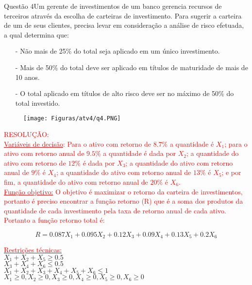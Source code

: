 \documentclass[12pt]{article}
\begin{document}
\begin{section}{Questão 4}{Um gerente de investimentos de um banco gerencia recursos de terceiros através da escolha de carteiras de investimento. Para sugerir a carteira de um de seus clientes, precisa levar em consideração a análise de risco efetuada, a qual determina que:}

\begin{itemize}
    \item[-] Não mais de 25\% do total seja aplicado em um único investimento.
    
    \item[-] Mais de 50\% do total deve ser aplicado em títulos de maturidade de mais de 10 anos.
    
    \item[-] O total aplicado em títulos de alto risco deve ser no máximo de 50\% do total investido. 
\end{itemize}


\begin{figure}[H]
    \centering
    \texttt{[image: Figuras/atv4/q4.PNG]}
\end{figure}

\end{section}

\noindent \textcolor{red}{RESOLUÇÃO:}\\

\noindent \textcolor{red}{\underline{Variáveis de decisão}: Para o ativo com retorno de $8.7\%$ a quantidade é $X_1$; para o ativo com retorno anual de $9.5\%$ a quantidade é dada por $X_2$; a quantidade do ativo com retorno de $12\%$ é dada por $X_3$; a quantidade do ativo com retorno anual de $9\%$ é $X_4$; a quantidade do ativo com retorno anual de $13\%$ é $X_5$; e por fim, a quantidade do ativo com retorno anual de $20\%$ é $X_6$.}\\

\noindent \textcolor{red}{\underline{Função objetivo:} O objetivo é maximizar o retorno da carteira de investimentos, portanto é preciso encontrar a função retorno (R) que é a soma dos produtos da quantidade de cada investimento pela taxa de retorno anual de cada ativo. Portanto a função retorno total é:}

$$
    R = 0.087X_{1} + 0.095X_{2} + 0.12X_{3} + 0.09X_{4} + 0.13X_{5} + 0.2X_{6}
$$

\noindent \textcolor{red}{\underline{Restrições técnicas:}}\\

\noindent $X_{1} + X_{2} + X_5 \geq 0.5$\\
$X_{3} + X_{4} + X_6 \leq 0.5$\\
$X_{1} + X_{2} +  X_{3} + X_{4} + X_5 + X_6 \leq 1$\\
$X_{1} \geq 0, X_{2} \geq 0, X_{3} \geq 0, X_{4} \geq 0, X_{5} \geq 0, X_{6} \geq 0$










\newpage
\end{document}
